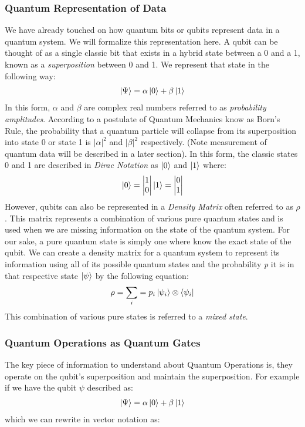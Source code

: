 \documentclass[conference]{IEEEtran}
\begin{document}
\subsubsection{Quantum Representation of Data}
We have already touched on how quantum bits or qubits represent data in a quantum system. We will formalize this representation here. A qubit can be thought of as a single classic bit that exists in a hybrid state between a 0 and a 1, known as a \emph{superposition} between 0 and 1. We represent that state in the following way:
\begin{align*}
\ket{\Psi} = \alpha\ket{0} + \beta\ket{1}
\end{align*}
In this form, $\alpha$ and $\beta$ are complex real numbers referred to as \emph{probability amplitudes}. According to a postulate of Quantum Mechanics know as Born's Rule, the probability that a quantum particle will collapse from its superposition into state 0 or state 1 is $|\alpha|^2$ and $|\beta|^2$ respectively. (Note measurement of quantum data will be described in a later section). In this form, the classic states 0 and 1 are described in \emph{Dirac Notation} as $\ket{0}$ and $\ket{1}$ where:
\begin{align*}
\ket{0}=\begin{vmatrix}
1\\
0\\
\end{vmatrix}
\ket{1}=\begin{vmatrix}
0\\
1\\
\end{vmatrix}
\end{align*}
\indent However, qubits can also be represented in a \emph{Density Matrix} often referred to as $\rho$. This matrix represents a combination of various pure quantum states and is used when we are missing information on the state of the quantum system. For our sake, a pure quantum state is simply one where know the exact state of the qubit. We can create a density matrix for a quantum system to represent its information using all of its possible quantum states and the probability \emph{p} it is in that respective state \emph{$\ket{\psi}$} by the following equation: 
\begin{align*}
\rho = \sum_{i}  = p_i \ket{\psi_i} \otimes \bra{\psi_i}
\end{align*}
This combination of various pure states is referred to a \emph{mixed state}.\cite{b9}
\subsubsection{Quantum Operations as Quantum Gates}
The key piece of information to understand about Quantum Operations is, they operate on the qubit's superposition and maintain the superposition. For example if we have the qubit $\psi$ described as:
\begin{align*}
\ket{\Psi} = \alpha\ket{0} + \beta\ket{1}
\end{align*}
which we can rewrite in vector notation as:
\end{document}
